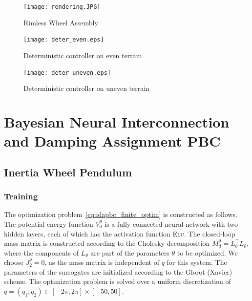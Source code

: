 \begin{figure}[H]
    \centering
    \texttt{[image: rendering.JPG]}
    \caption{Rimless Wheel Assembly}
    \label{fig:hardware}
\end{figure}
\begin{figure}[H]
    \centering
    \texttt{[image: deter\_even.eps]}
    \caption{Deterministic controller on even terrain}
    \label{fig:deter_even}
\end{figure}

\begin{figure}[H]
    \centering
    \texttt{[image: deter\_uneven.eps]}
    \caption{Deterministic controller on uneven terrain}
    \label{fig:deter_uneven}
\end{figure}

\section{Bayesian Neural Interconnection and Damping Assignment PBC}
\subsection{Inertia Wheel Pendulum}

\subsubsection{Training}
The optimization problem~\eqref{eq:idapbc_finite_optim} is constructed as
follows. The potential energy function $V_d^\theta$ is a fully-connected neural
network with two hidden layers, each of which has the activation function
\textsc{Elu}.
%
The closed-loop mass matrix is constructed according to the Cholesky
decomposition $M_d^\theta = L^\top_\theta L_\theta$, where the components of
$L_\theta$ are part of the parameters $\theta$ to be optimized.
%
We choose $J_2^\theta = 0$, as the mass matrix is independent of $q$ for
this system.
%
The parameters of the surrogates are initialized according to the Glorot
(Xavier)~\cite{glorot2010understanding} scheme.
%
The optimization problem is solved over a uniform discretization of $q = \left(
q_1, q_2 \right) \in [-2\pi, 2\pi] \times [-50, 50]$.


